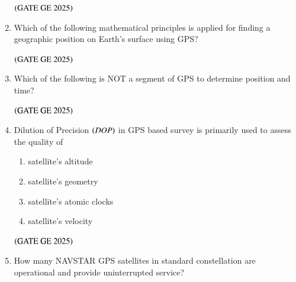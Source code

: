 \documentclass[journal,12pt,onecolumn]{IEEEtran}
\theoremstyle{remark}
\begin{document}
\begin{enumerate}
\begin{enumerate}
\end{enumerate}
\hfill $\left(\text{GATE GE 2025}\right)$
\bigskip
\item Which 
of the following mathematical principles is applied for finding a geographic position on Earth's surface using GPS?
\begin{enumerate}
\end{enumerate}
\hfill $\left(\text{GATE GE 2025}\right)$
\bigskip
\item Which of the following is NOT a segment of GPS to determine position and time?
\begin{enumerate}
\end{enumerate}
\hfill $\left(\text{GATE GE 2025}\right)$
\bigskip
\item Dilution of Precision $\left(DOP\right)$ in GPS based survey is primarily used to assess the quality of
\begin{enumerate}
\item satellite's altitude
\item satellite's geometry
\item satellite's atomic clocks
\item satellite's velocity
\end{enumerate}
\hfill $\left(\text{GATE GE 2025}\right)$
\bigskip
\item How many NAVSTAR GPS satellites in standard constellation are operational and provide uninterrupted service?
\begin{enumerate}
\end{enumerate}
\end{enumerate}
\end{document}
